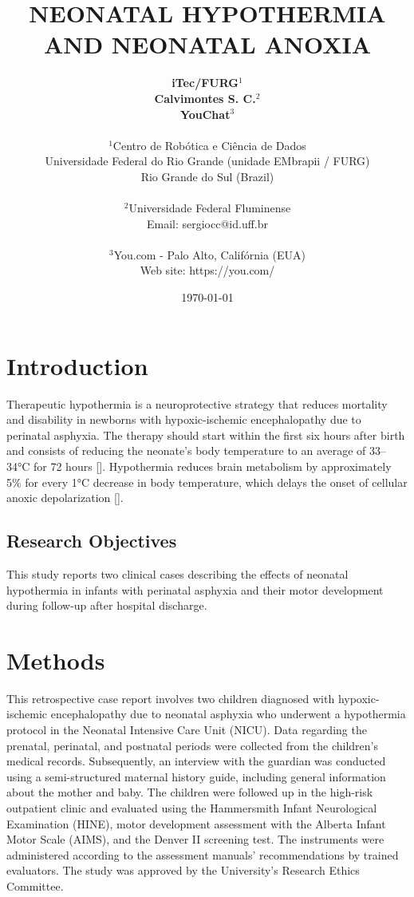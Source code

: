 \documentclass[11pt,a4paper]{article}
\title{\textbf{NEONATAL HYPOTHERMIA AND NEONATAL ANOXIA}}
\author{
	\textbf{iTec/FURG}$^{1}$ \\
	\textbf{Calvimontes S. C.}$^{2}$ \\
	\textbf{YouChat}$^{3}$ \\
	\\
	\small $^{1}$Centro de Robótica e Ciência de Dados \\
	\small Universidade Federal do Rio Grande (unidade EMbrapii / FURG) \\
	\small Rio Grande do Sul (Brazil) \\
	\\
	\small $^{2}$Universidade Federal Fluminense \\
	\small Email: sergiocc@id.uff.br \\
	\\
	\small $^{3}$You.com - Palo Alto, Califórnia (EUA) \\
	\small Web site: https://you.com/
}
\date{\today}
\begin{document}
	
	\maketitle
	
	\newpage
	
	\section{Introduction}
	Therapeutic hypothermia is a neuroprotective strategy that reduces mortality and disability in newborns with hypoxic-ischemic encephalopathy due to perinatal asphyxia. The therapy should start within the first six hours after birth and consists of reducing the neonate's body temperature to an average of 33–34°C for 72 hours [\cite{Azzopardi2014, Thayyil2021, Abate2021}]. Hypothermia reduces brain metabolism by approximately 5\% for every 1°C decrease in body temperature, which delays the onset of cellular anoxic depolarization [\cite{Silveira2015}].
		
	\subsection{Research Objectives}
	This study reports two clinical cases describing the effects of neonatal hypothermia in infants with perinatal asphyxia and their motor development during follow-up after hospital discharge.
	
	\section{Methods}
	This retrospective case report involves two children diagnosed with hypoxic-ischemic encephalopathy due to neonatal asphyxia who underwent a hypothermia protocol in the Neonatal Intensive Care Unit (NICU). Data regarding the prenatal, perinatal, and postnatal periods were collected from the children's medical records. Subsequently, an interview with the guardian was conducted using a semi-structured maternal history guide, including general information about the mother and baby. The children were followed up in the high-risk outpatient clinic and evaluated using the Hammersmith Infant Neurological Examination (HINE), motor development assessment with the Alberta Infant Motor Scale (AIMS), and the Denver II screening test. The instruments were administered according to the assessment manuals' recommendations by trained evaluators. The study was approved by the University's Research Ethics Committee.
	
\end{document}
